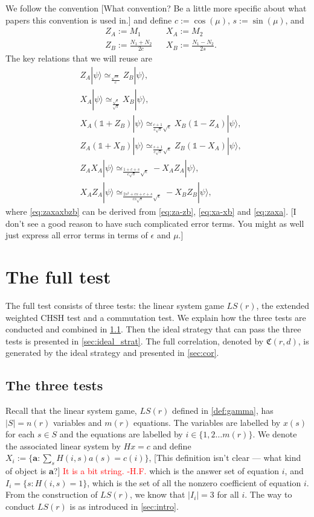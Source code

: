 \documentclass[11pt,letterpaper]{article}
\newcommand{\ket}[1]{|#1\rangle}
\newcommand{\1}{\mathbb{1}}
\newcommand{\LS}{LS}
\newcommand{\nr}{n(r)}
\newcommand{\mr}{m(r)}
\newcommand{\fC}{\mathfrak{C}}
\newcommand{\ba}{\pmb{a}}
\newcommand{\se}{\sqrt{\epsilon}}
\newcommand{\appd}[1]{\simeq_{#1}}
\def\carl#1{{\color{blue} #1}}
\newcommand{\hfc}[1]{\textcolor{red}{#1 -H.F.}}
\theoremstyle{definition}
\begin{document}
We follow the convention \carl{[What convention?  Be a little more specific about what papers this convention is used in.]} and define $c := \cos(\mu)$, $s := \sin(\mu)$, and
\begin{align*}
	&Z_A := M_1 && X_A := M_2\\
	&Z_B := \frac{N_1+N_2}{2c} && X_B := \frac{N_1-N_2}{2s}.
\end{align*}
The key relations that we will reuse are
\begin{align}
	\label{eq:za-zb}& Z_A\ket{\psi} \appd{\frac{\sqrt{s\epsilon}}{c}} Z_B\ket{\psi},\\
	\label{eq:xa-xb}&X_A\ket{\psi} \appd{\frac{\sqrt{\epsilon}}{\sqrt{s}}} X_B \ket{\psi}, \\
	\label{eq:xazb}&X_A(\1+Z_B)\ket{\psi} \appd{\frac{c+1}{c\sqrt{s}} \se} X_B(\1-Z_A) \ket{\psi},\\
	\label{eq:zaxb}&Z_A(\1+X_B)\ket{\psi} \appd{ \frac{s+1}{c\sqrt{s}} \se} Z_B(\1-X_A) \ket{\psi},\\
	\label{eq:zaxa}&Z_AX_A\ket{\psi} \appd{\frac{1+c+s}{c\sqrt{s}} \se} -X_AZ_A \ket{\psi},\\
	\label{eq:zaxaxbzb}&X_AZ_A \ket{\psi} \appd{\frac{2s^2+cs+c+s}{cs\sqrt{s}} \sqrt{\epsilon}} -X_BZ_B \ket{\psi},
\end{align}
where \cref{eq:zaxaxbzb} can be derived from \cref{eq:za-zb}, \cref{eq:xa-xb} and \cref{eq:zaxa}.
\carl{[I don't see a good reason to have such complicated error terms.  You might as well just express all error terms in terms of $\epsilon$ and $\mu$.]}  
\section{The full test}
\label{sec:full_test}
The full test consists of three tests: the linear system game $\LS(r)$,
the extended weighted CHSH test and a commutation test. We explain how the three tests are conducted and
combined in \cref{sec:tests}. Then the ideal strategy that can pass
the three tests is presented in \cref{sec:ideal_strat}. The full correlation, denoted by $\fC(r,d)$, is generated by the ideal strategy and presented in \cref{sec:cor}.

\subsection{The three tests}
\label{sec:tests}
Recall that the linear system game, $\LS(r)$ defined in \cref{def:gamma}, has $|S| = \nr$ variables and $\mr$ equations.
The variables are labelled by $x(s)$ for each $s \in S$ and
the equations are labelled by $i \in \{1, 2 \dots \mr\}$.
We denote the associated linear system by $Hx = c$ and
define $X_i := \{ \ba : \sum_{s} H(i,s)a(s) = c(i) \}$, \carl{[This definition isn't clear --- what kind of object is $\ba$?]}
\hfc{It is a bit string.} 
which is the answer set of equation $i$,
and $I_i = \{ s : H(i,s) = 1\}$, which is the set of all the nonzero coefficient of equation $i$.
From the construction of $\LS(r)$, we know that $|I_i| = 3$ for all $i$.
The way to conduct $\LS(r)$ is as introduced in \cref{sec:intro}.
\end{document}
